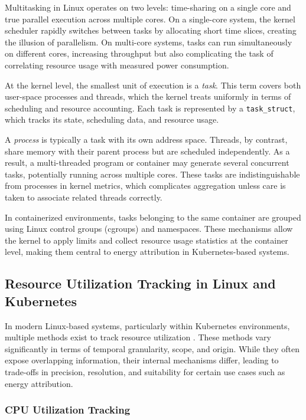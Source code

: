 Multitasking in Linux operates on two levels: time-sharing on a single core and true parallel execution across multiple cores. On a single-core system, the kernel scheduler rapidly switches between tasks by allocating short time slices, creating the illusion of parallelism. On multi-core systems, tasks can run simultaneously on different cores, increasing throughput but also complicating the task of correlating resource usage with measured power consumption.

At the kernel level, the smallest unit of execution is a \emph{task}. This term covers both user-space processes and threads, which the kernel treats uniformly in terms of scheduling and resource accounting. Each task is represented by a \texttt{task\_struct}, which tracks its state, scheduling data, and resource usage.

A \emph{process} is typically a task with its own address space. Threads, by contrast, share memory with their parent process but are scheduled independently. As a result, a multi-threaded program or container may generate several concurrent tasks, potentially running across multiple cores. These tasks are indistinguishable from processes in kernel metrics, which complicates aggregation unless care is taken to associate related threads correctly.

In containerized environments, tasks belonging to the same container are grouped using Linux control groups (cgroups) and namespaces. These mechanisms allow the kernel to apply limits and collect resource usage statistics at the container level, making them central to energy attribution in Kubernetes-based systems.

\subsection{Resource Utilization Tracking in Linux and Kubernetes}
\label{sec:utilization_tracking}

In modern Linux-based systems, particularly within Kubernetes environments, multiple methods exist to track resource utilization \parencite{kernelprocfs, kernelcgroupv1, kernelcgroupv2, ciliumbpf, cadvisorgithub, metricsservergithub}. These methods vary significantly in terms of temporal granularity, scope, and origin. While they often expose overlapping information, their internal mechanisms differ, leading to trade-offs in precision, resolution, and suitability for certain use cases such as energy attribution.

\subsubsection*{CPU Utilization Tracking}

